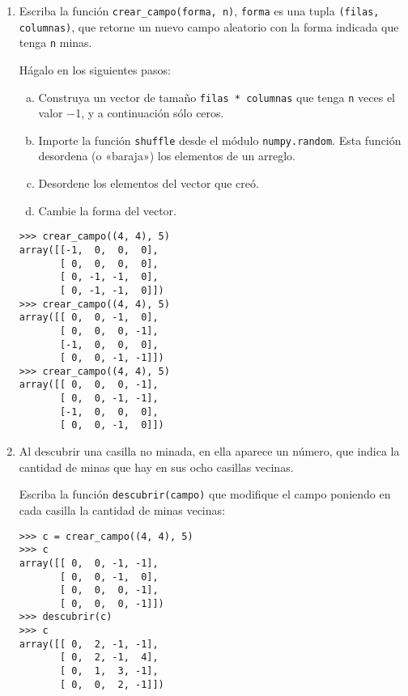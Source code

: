 \begin{enumerate}
\item
  Escriba la función \lstinline!crear_campo(forma, n)!,
  \lstinline!forma! es una tupla \lstinline!(filas, columnas)!, que
  retorne un nuevo campo aleatorio con la forma indicada que tenga
  \lstinline!n! minas.

  Hágalo en los siguientes pasos:

  \begin{enumerate}[a.]
  \item
    Construya un vector de tamaño \lstinline!filas * columnas! que tenga
    \lstinline!n! veces el valor −1, y a continuación sólo ceros.
  \item
    Importe la función \lstinline!shuffle! desde el módulo
    \lstinline!numpy.random!. Esta función desordena (o «baraja») los
    elementos de un arreglo.
  \item
    Desordene los elementos del vector que creó.
  \item
    Cambie la forma del vector.
  \end{enumerate}

\begin{lstlisting}
>>> crear_campo((4, 4), 5)
array([[-1,  0,  0,  0],
       [ 0,  0,  0,  0],
       [ 0, -1, -1,  0],
       [ 0, -1, -1,  0]])
>>> crear_campo((4, 4), 5)
array([[ 0,  0, -1,  0],
       [ 0,  0,  0, -1],
       [-1,  0,  0,  0],
       [ 0,  0, -1, -1]])
>>> crear_campo((4, 4), 5)
array([[ 0,  0,  0, -1],
       [ 0,  0, -1, -1],
       [-1,  0,  0,  0],
       [ 0,  0, -1,  0]])
\end{lstlisting}
\item
  Al descubrir una casilla no minada, en ella aparece un número, que
  indica la cantidad de minas que hay en sus ocho casillas vecinas.

  Escriba la función \lstinline!descubrir(campo)! que modifique el campo
  poniendo en cada casilla la cantidad de minas vecinas:

\begin{lstlisting}
>>> c = crear_campo((4, 4), 5)
>>> c
array([[ 0,  0, -1, -1],
       [ 0,  0, -1,  0],
       [ 0,  0,  0, -1],
       [ 0,  0,  0, -1]])
>>> descubrir(c)
>>> c
array([[ 0,  2, -1, -1],
       [ 0,  2, -1,  4],
       [ 0,  1,  3, -1],
       [ 0,  0,  2, -1]])
\end{lstlisting}
\end{enumerate}
